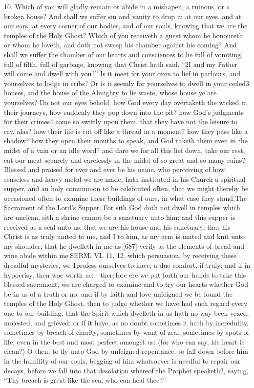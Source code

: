 10. Which of you will gladly remain or abide in a mishapen, a ruinous, or a broken house? And shall we suffer sin and vanity to drop in at our eyes, and at our ears, at every corner of our bodies, and of our souls, knowing that we are the temples of the Holy Ghost? Which of you receiveth a guest whom he honoureth, or whom he loveth, and doth not sweep his chamber against his coming? And shall we suffer the chamber of our hearts and consciences to lie full of vomiting, full of filth, full of garbage, knowing that Christ hath said, “2I and my Father will come and dwell with you?” Is it meet for your oxen to lief in parlours, and yourselves to lodge in cribs? Or is it seemly for yourselves to dwell in your ceiled3 houses, and the house of the Almighty to lie waste, whose house ye are yourselves? Do not our eyes behold, how God every day overtaketh the wicked in their journeys, how suddenly they pop down into the pit? how God’s judgments for their crimes4 come so swiftly upon them, that they have not the leisure to cry, alas? how their life is cut off like a thread in a moment? how they pass like a shadow? how they open their mouths to speak, and God taketh them even in the midst of a vain or an idle word? and dare we for all this lief down, take our rest, eat our meat securely and carelessly in the midst of so great and so many ruins? Blessed and praised for ever and ever be his name, who perceiving of how senseless and heavy metal we are made, hath instituted in his Church a spiritual supper, and an holy communion to be celebrated often, that we might thereby be occasioned often to examine these buildings of ours, in what case they stand.The Sacrament of the Lord’s Supper. For sith God doth not dwell in temples which are unclean, sith a shrine cannot be a sanctuary unto him; and this supper is received as a seal unto us, that we are his house and his sanctuary; that his Christ is as truly united to me, and I to him, as my arm is united and knit unto my shoulder; that he dwelleth in me as [687] verily as the elements of bread and wine abide within me;SERM. VI. 11, 12. which persuasion, by receiving these dreadful mysteries, we 1profess ourselves to have, a due comfort, if truly; and if in hypocrisy, then woe worth us:—therefore ere we put forth our hands to take this blessed sacrament, we are charged to examine and to try our hearts whether God be in us of a truth or no: and if by faith and love unfeigned we be found the temples of the Holy Ghost, then to judge whether we have had such regard every one to our building, that the Spirit which dwelleth in us hath no way been vexed, molested, and grieved: or if it have, as no doubt sometimes it hath by incredulity, sometimes by breach of charity, sometimes by want of zeal, sometimes by spots of life, even in the best and most perfect amongst us: (for who can say, his heart is clean?) O then, to fly unto God by unfeigned repentance, to fall down before him in the humility of our souls, begging of him whatsoever is needful to repair our decays, before we fall into that desolation whereof the Prophet speaketh2, saying, “Thy breach is great like the sea, who can heal thee?”

